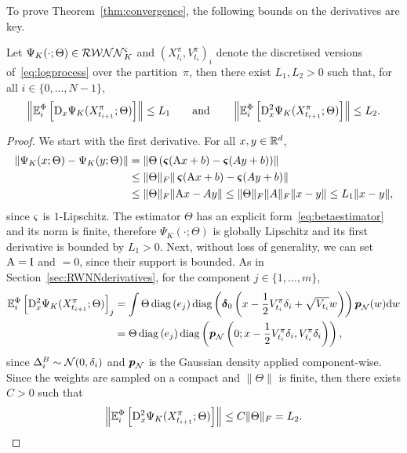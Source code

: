 To prove Theorem~\ref{thm:convergence},
the following bounds on the derivatives are key.
\begin{lemma}\label{lem:derivativeBounds}
Let $\Psi_K(\cdot; \Theta)\in\mathcal{RWNN}^{\varsigma}_K$ and $(X^\pi_{t_i}, V^\pi_{t_i})_{i}$ denote the discretised versions of~\eqref{eq:logprocess} over the partition~$\pi$, then there exist $L_1, L_2 > 0$ such that, 
for all $i\in\{0,\dots,N-1\}$,
$$
\left\|\mathbb{E}_i^\Phi\left[\mathrm{D}_{x}\Psi_K(X^\pi_{t_{i+1}}; \Theta)\right]\right\| \leq L_1 
\qquad \text{and} \qquad \left\|\mathbb{E}_i^\Phi\left[\mathrm{D}_{x}^2\Psi_K(X^\pi_{t_{i+1}}; \Theta)\right]\right\| \leq L_2.
$$
\end{lemma}
\begin{proof}
We start with the first derivative. 
For all $x,y\in\mathbb{R}^d$,
\begin{align*}
    \left\|\Psi_K(x; \Theta)-\Psi_K(y; \Theta)\right\| 
    &= \left\| \Theta \left(\operatorname{\boldsymbol\varsigma}(\mathrm{A} x+b)-\operatorname{\boldsymbol\varsigma}(Ay+b)\right) \right\| \\
    &\leq \|\Theta\|_F\|\operatorname{\boldsymbol\varsigma}(\mathrm{A} x+b)-\operatorname{\boldsymbol\varsigma}(Ay+b)\| \\
    &\leq \|\Theta\|_F\|\mathrm{A} x-Ay\| \leq \|\Theta\|_F\|A\|_F\|x-y\|
    \leq L_1\|x-y\|,
\end{align*}
since $\varsigma$ is $1$-Lipschitz. 
The estimator $\Theta$ has an explicit form~\eqref{eq:betaestimator} and its norm is finite, therefore $\Psi_K(\cdot; \Theta)$ is globally Lipschitz and its first derivative is bounded by $L_1>0$. 
Next, without loss of generality, we can set $\mathrm{A}=\mathrm{I}$ and $\bm=0$, since their support is bounded. 
As in Section~\ref{sec:RWNNderivatives}, 
for the component $j\in\{1,\dots,m\}$,
\begin{align*}
    \EE_i^\Phi\left[\Dx^2 \Psi_K(X^\pi_{t_{i+1}}; \Theta)\right]_j %
    &= \int \Theta\operatorname{diag}\left(e_{j}\right)\operatorname{diag}\left(\boldsymbol\delta_0\left(x-\frac12 V^\pi_{t_i}\Deli  + \sqrt{V_{t_i}}w\right)\right) \boldsymbol p_\Nn(w) \D w \\
    &= \Theta \operatorname{diag}\left(e_{j}\right)\operatorname{diag}\left( \boldsymbol p_\Nn\left(0; x-\frac12 V^\pi_{t_i}\Deli, V^\pi_{t_i}\Deli \right)\right),
\end{align*}
since $\Delta^{B}_{i}\sim\mathcal{N}(0, \delta_{i})$ and $\boldsymbol p_{\mathcal{N}}$ is the Gaussian density applied component-wise. 
Since the weights are sampled on a compact and  $\|\Theta\|$ is finite, then there exists $C>0$ such that
$$
\left\|\mathbb{E}_i^\Phi\left[\mathrm{D}_{x}^2 \Psi_K(X^\pi_{t_{i+1}}; \Theta)\right]\right\| \leq C\|\Theta\|_F = L_2.
$$
\end{proof}
